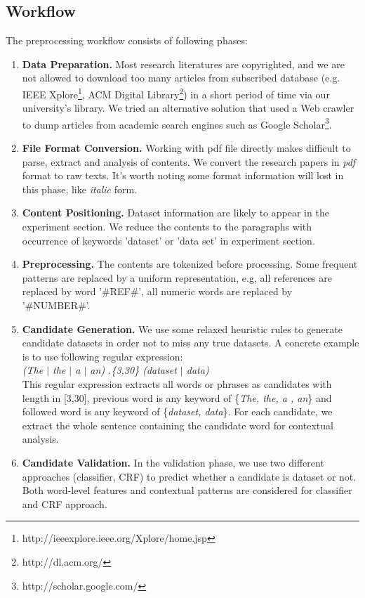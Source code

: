 \documentclass[11pt]{article}
\begin{document}
\subsection{Workflow}
The preprocessing workflow consists of following phases:
\begin{enumerate}
\item \textbf{Data Preparation.} Most research literatures are copyrighted, and we are not allowed to download too many articles from subscribed database (e.g. IEEE Xplore\footnote{http://ieeexplore.ieee.org/Xplore/home.jsp}, ACM Digital Library\footnote{http://dl.acm.org/}) in a short period of time via our university's library. We tried an alternative solution that used a Web crawler to dump articles from academic search engines such as Google Scholar\footnote{http://scholar.google.com/}.
\item \textbf{File Format Conversion.} Working with pdf file directly makes difficult to parse, extract and analysis of contents. We convert the research papers in \emph{pdf} format to raw texts. It's worth noting some format information will lost in this phase, like \emph{italic} form. 
\item \textbf{Content Positioning.} Dataset information are likely to appear in the experiment section. We reduce the contents to the paragraphs with occurrence of keywords 'dataset' or 'data set' in experiment section.
\item \textbf{Preprocessing.} The contents are tokenized before processing. Some frequent patterns are replaced by a uniform representation, e.g, all references are replaced by word '\#REF\#', all numeric words are replaced by '\#NUMBER\#'. 
\item \textbf{Candidate Generation.} We use some relaxed heuristic rules to generate candidate datasets in order not to miss any true datasets. A concrete example is to use following regular expression: \\
\textit{(The $|$ the $|$ a $|$ an) .\{3,30\} (dataset $|$ data)} \\
This regular expression extracts all words or phrases as candidates with length in [3,30], previous word is any keyword of \{\textit{The, the, a , an}\} and followed word is any keyword of \{\textit{dataset, data}\}. For each candidate, we extract the whole sentence containing the candidate word for contextual analysis.
\item \textbf{Candidate Validation.} In the validation phase, we use two different approaches (classifier, CRF) to predict whether a candidate is dataset or not. Both word-level features and contextual patterns are considered for classifier and CRF approach.  
\end{enumerate}
\end{document}
